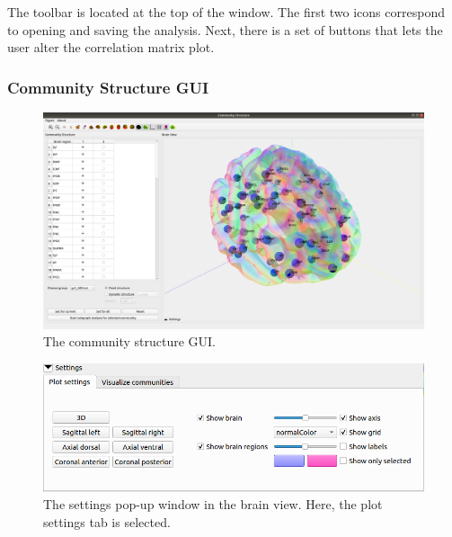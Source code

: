 \documentclass{article}
\begin{document}
The toolbar is located at the top of the window. The first two icons correspond to opening and saving the analysis. Next, there is a set of buttons that lets the user alter the correlation matrix plot.

\subsubsection{Community Structure GUI}

\begin{figure}[h]
    \centering
    \includegraphics[width=\linewidth]{community_structure.png}
    \caption{The community structure GUI.}
    \label{fig:community}
\end{figure}

\begin{figure}[h]
    \centering
    \includegraphics[width=\linewidth]{plot_settings.png}
    \caption{The settings pop-up window in the brain view. Here, the plot settings tab is selected.}
    \label{fig:plot_settings}
\end{figure}
\end{document}
